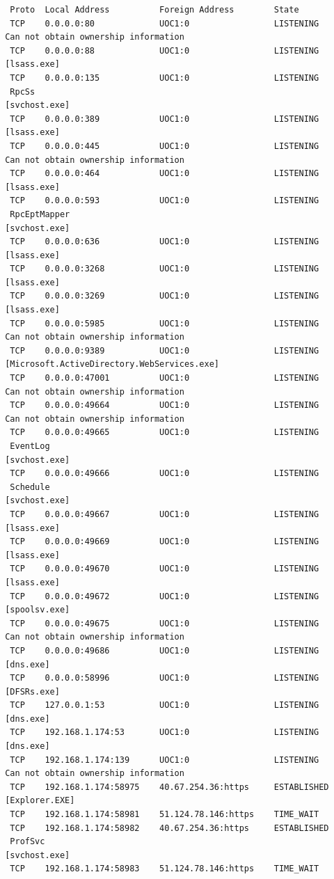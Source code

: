 \documentclass[10pt,a4paper]{article}
\begin{document}
\begin{enumerate}[label=\textbf{\alph*)}]
\begin{lstlisting}
  Proto  Local Address          Foreign Address        State
  TCP    0.0.0.0:80             UOC1:0                 LISTENING
 Can not obtain ownership information
  TCP    0.0.0.0:88             UOC1:0                 LISTENING
 [lsass.exe]
  TCP    0.0.0.0:135            UOC1:0                 LISTENING
  RpcSs
 [svchost.exe]
  TCP    0.0.0.0:389            UOC1:0                 LISTENING
 [lsass.exe]
  TCP    0.0.0.0:445            UOC1:0                 LISTENING
 Can not obtain ownership information
  TCP    0.0.0.0:464            UOC1:0                 LISTENING
 [lsass.exe]
  TCP    0.0.0.0:593            UOC1:0                 LISTENING
  RpcEptMapper
 [svchost.exe]
  TCP    0.0.0.0:636            UOC1:0                 LISTENING
 [lsass.exe]
  TCP    0.0.0.0:3268           UOC1:0                 LISTENING
 [lsass.exe]
  TCP    0.0.0.0:3269           UOC1:0                 LISTENING
 [lsass.exe]
  TCP    0.0.0.0:5985           UOC1:0                 LISTENING
 Can not obtain ownership information
  TCP    0.0.0.0:9389           UOC1:0                 LISTENING
 [Microsoft.ActiveDirectory.WebServices.exe]
  TCP    0.0.0.0:47001          UOC1:0                 LISTENING
 Can not obtain ownership information
  TCP    0.0.0.0:49664          UOC1:0                 LISTENING
 Can not obtain ownership information
  TCP    0.0.0.0:49665          UOC1:0                 LISTENING
  EventLog
 [svchost.exe]
  TCP    0.0.0.0:49666          UOC1:0                 LISTENING
  Schedule
 [svchost.exe]
  TCP    0.0.0.0:49667          UOC1:0                 LISTENING
 [lsass.exe]
  TCP    0.0.0.0:49669          UOC1:0                 LISTENING
 [lsass.exe]
  TCP    0.0.0.0:49670          UOC1:0                 LISTENING
 [lsass.exe]
  TCP    0.0.0.0:49672          UOC1:0                 LISTENING
 [spoolsv.exe]
  TCP    0.0.0.0:49675          UOC1:0                 LISTENING
 Can not obtain ownership information
  TCP    0.0.0.0:49686          UOC1:0                 LISTENING
 [dns.exe]
  TCP    0.0.0.0:58996          UOC1:0                 LISTENING
 [DFSRs.exe]
  TCP    127.0.0.1:53           UOC1:0                 LISTENING
 [dns.exe]
  TCP    192.168.1.174:53       UOC1:0                 LISTENING
 [dns.exe]
  TCP    192.168.1.174:139      UOC1:0                 LISTENING
 Can not obtain ownership information
  TCP    192.168.1.174:58975    40.67.254.36:https     ESTABLISHED
 [Explorer.EXE]
  TCP    192.168.1.174:58981    51.124.78.146:https    TIME_WAIT
  TCP    192.168.1.174:58982    40.67.254.36:https     ESTABLISHED
  ProfSvc
 [svchost.exe]
  TCP    192.168.1.174:58983    51.124.78.146:https    TIME_WAIT

\end{lstlisting}
\end{enumerate}
\end{document}
